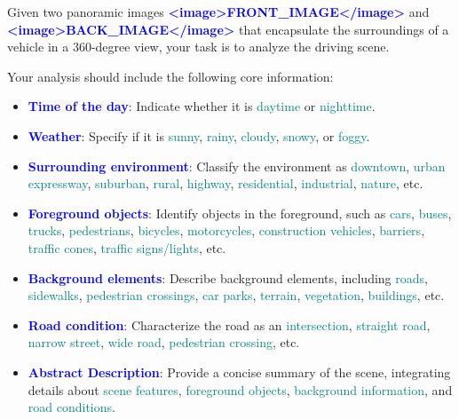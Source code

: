\begin{tcolorbox}[myboxstyle]

Given two panoramic images \textbf{\textcolor{blue}{<image>FRONT\_IMAGE</image>}} and \textbf{\textcolor{blue}{<image>BACK\_IMAGE</image>}} that encapsulate the surroundings of a vehicle in a 360-degree view, your task is to analyze the driving scene.

Your analysis should include the following core information:
\begin{itemize}[leftmargin=10pt]
  \item \textbf{\textcolor{blue}{Time of the day}}: Indicate whether it is \textcolor{teal}{daytime} or \textcolor{teal}{nighttime}.
  \item \textbf{\textcolor{blue}{Weather}}: Specify if it is \textcolor{teal}{sunny}, \textcolor{teal}{rainy}, \textcolor{teal}{cloudy}, \textcolor{teal}{snowy}, or \textcolor{teal}{foggy}.
  \item \textbf{\textcolor{blue}{Surrounding environment}}: Classify the environment as \textcolor{teal}{downtown}, \textcolor{teal}{urban expressway}, \textcolor{teal}{suburban}, \textcolor{teal}{rural}, \textcolor{teal}{highway}, \textcolor{teal}{residential}, \textcolor{teal}{industrial}, \textcolor{teal}{nature}, etc.
  \item \textbf{\textcolor{blue}{Foreground objects}}: Identify objects in the foreground, such as \textcolor{teal}{cars}, \textcolor{teal}{buses}, \textcolor{teal}{trucks}, \textcolor{teal}{pedestrians}, \textcolor{teal}{bicycles}, \textcolor{teal}{motorcycles}, \textcolor{teal}{construction vehicles}, \textcolor{teal}{barriers}, \textcolor{teal}{traffic cones}, \textcolor{teal}{traffic signs/lights}, etc.
  \item \textbf{\textcolor{blue}{Background elements}}: Describe background elements, including \textcolor{teal}{roads}, \textcolor{teal}{sidewalks}, \textcolor{teal}{pedestrian crossings}, \textcolor{teal}{car parks}, \textcolor{teal}{terrain}, \textcolor{teal}{vegetation}, \textcolor{teal}{buildings}, etc.
  \item \textbf{\textcolor{blue}{Road condition}}: Characterize the road as an \textcolor{teal}{intersection}, \textcolor{teal}{straight road}, \textcolor{teal}{narrow street}, \textcolor{teal}{wide road}, \textcolor{teal}{pedestrian crossing}, etc.
  \item \textbf{\textcolor{blue}{Abstract Description}}: Provide a concise summary of the scene, integrating details about \textcolor{teal}{scene features}, \textcolor{teal}{foreground objects}, \textcolor{teal}{background information}, and \textcolor{teal}{road conditions}.
\end{itemize}


\end{tcolorbox}
